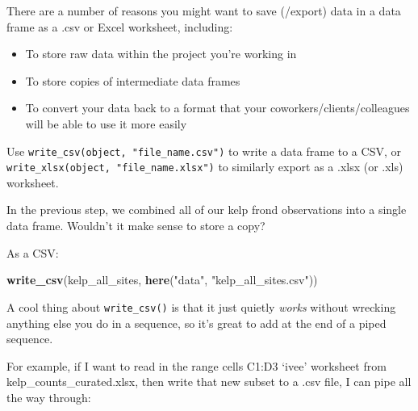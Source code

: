 \documentclass[]{book}
\newenvironment{Shaded}{\begin{snugshade}}{\end{snugshade}}
\newcommand{\DataTypeTok}[1]{\textcolor[rgb]{0.13,0.29,0.53}{#1}}
\newcommand{\KeywordTok}[1]{\textcolor[rgb]{0.13,0.29,0.53}{\textbf{#1}}}
\newcommand{\NormalTok}[1]{#1}
\newcommand{\OperatorTok}[1]{\textcolor[rgb]{0.81,0.36,0.00}{\textbf{#1}}}
\newcommand{\StringTok}[1]{\textcolor[rgb]{0.31,0.60,0.02}{#1}}
\providecommand{\tightlist}{%
  \setlength{\itemsep}{0pt}\setlength{\parskip}{0pt}}
\begin{document}
There are a number of reasons you might want to save (/export) data in a data frame as a .csv or Excel worksheet, including:

\begin{itemize}
\tightlist
\item
  To store raw data within the project you're working in
\item
  To store copies of intermediate data frames
\item
  To convert your data back to a format that your coworkers/clients/colleagues will be able to use it more easily
\end{itemize}

Use \texttt{write\_csv(object,\ "file\_name.csv")} to write a data frame to a CSV, or \texttt{write\_xlsx(object,\ "file\_name.xlsx")} to similarly export as a .xlsx (or .xls) worksheet.

In the previous step, we combined all of our kelp frond observations into a single data frame. Wouldn't it make sense to store a copy?

As a CSV:

\begin{Shaded}
\begin{Highlighting}[]
\KeywordTok{write_csv}\NormalTok{(kelp_all_sites, }\KeywordTok{here}\NormalTok{(}\StringTok{"data"}\NormalTok{, }\StringTok{"kelp_all_sites.csv"}\NormalTok{))}
\end{Highlighting}
\end{Shaded}

A cool thing about \texttt{write\_csv()} is that it just quietly \emph{works} without wrecking anything else you do in a sequence, so it's great to add at the end of a piped sequence.

For example, if I want to read in the range cells C1:D3 `ivee' worksheet from kelp\_counts\_curated.xlsx, then write that new subset to a .csv file, I can pipe all the way through:

\begin{Shaded}
\end{Shaded}
\end{document}
